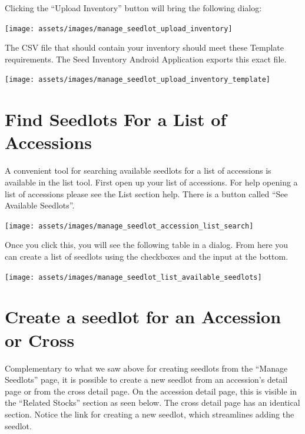 \documentclass[
  12pt,
]{book}
\begin{document}
Clicking the ``Upload Inventory'' button will bring the following dialog:

\begin{center}\texttt{[image: assets/images/manage\_seedlot\_upload\_inventory]} \end{center}

The CSV file that should contain your inventory should meet these Template requirements. The Seed Inventory Android Application exports this exact file.

\begin{center}\texttt{[image: assets/images/manage\_seedlot\_upload\_inventory\_template]} \end{center}

\hypertarget{find-seedlots-for-a-list-of-accessions}{%
\section{Find Seedlots For a List of Accessions}\label{find-seedlots-for-a-list-of-accessions}}

A convenient tool for searching available seedlots for a list of accessions is available in the list tool. First open up your list of accessions. For help opening a list of accessions please see the List section help. There is a button called ``See Available Seedlots''.

\begin{center}\texttt{[image: assets/images/manage\_seedlot\_accession\_list\_search]} \end{center}

Once you click this, you will see the following table in a dialog. From here you can create a list of seedlots using the checkboxes and the input at the bottom.

\begin{center}\texttt{[image: assets/images/manage\_seedlot\_list\_available\_seedlots]} \end{center}

\hypertarget{create-a-seedlot-for-an-accession-or-cross}{%
\section{Create a seedlot for an Accession or Cross}\label{create-a-seedlot-for-an-accession-or-cross}}

Complementary to what we saw above for creating seedlots from the ``Manage Seedlots'' page, it is possible to create a new seedlot from an accession's detail page or from the cross detail page. On the accession detail page, this is visible in the ``Related Stocks'' section as seen below. The cross detail page has an identical section. Notice the link for creating a new seedlot, which streamlines adding the seedlot.
\end{document}
